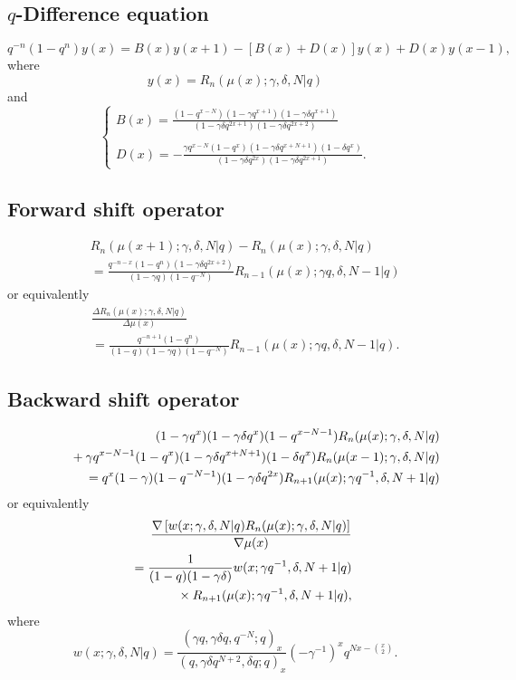 \documentclass[envcountchap,graybox]{svmono}
\newcommand{\mathindent}{\hspace{7.5mm}}
\begin{document}
\subsection*{$q$-Difference equation}
\begin{equation}
\label{dvDualqHahn}
q^{-n}(1-q^n)y(x)=B(x)y(x+1)-\left[B(x)+D(x)\right]y(x)
+D(x)y(x-1),
\end{equation}
where
$$y(x)=R_n(\mu(x);\gamma,\delta,N|q)$$
and
$$\left\{\begin{array}{l}\displaystyle B(x)=\frac{(1-q^{x-N})(1-\gamma q^{x+1})(1-\gamma\delta q^{x+1})}
{(1-\gamma\delta q^{2x+1})(1-\gamma\delta q^{2x+2})}\\
\\
\displaystyle D(x)=-\frac{\gamma q^{x-N}(1-q^x)(1-\gamma\delta q^{x+N+1})(1-\delta q^x)}
{(1-\gamma\delta q^{2x})(1-\gamma\delta q^{2x+1})}.\end{array}\right.$$

\subsection*{Forward shift operator}
\begin{eqnarray}
\label{shift1DualqHahnI}
& &R_n(\mu(x+1);\gamma,\delta,N|q)-R_n(\mu(x);\gamma,\delta,N|q)\nonumber\\
& &{}=\frac{q^{-n-x}(1-q^n)(1-\gamma\delta q^{2x+2})}{(1-\gamma q)(1-q^{-N})}
R_{n-1}(\mu(x);\gamma q,\delta,N-1|q)
\end{eqnarray}
or equivalently
\begin{eqnarray}
\label{shift1DualqHahnII}
& &\frac{\Delta R_n(\mu(x);\gamma,\delta,N|q)}{\Delta\mu(x)}\nonumber\\
& &{}=\frac{q^{-n+1}(1-q^n)}{(1-q)(1-\gamma q)(1-q^{-N})}R_{n-1}(\mu(x);\gamma q,\delta,N-1|q).
\end{eqnarray}

\subsection*{Backward shift operator}
\begin{eqnarray}
\label{shift2DualqHahnI}
& &(1-\gamma q^x)(1-\gamma\delta q^x)(1-q^{x-N-1})R_n(\mu(x);\gamma,\delta,N|q)\nonumber\\
& &{}\mathindent{}+\gamma q^{x-N-1}(1-q^x)(1-\gamma\delta q^{x+N+1})(1-\delta q^x)R_n(\mu(x-1);\gamma,\delta,N|q)\nonumber\\
& &{}=q^x(1-\gamma)(1-q^{-N-1})(1-\gamma\delta q^{2x})R_{n+1}(\mu(x);\gamma q^{-1},\delta,N+1|q)
\end{eqnarray}
or equivalently
\begin{eqnarray}
\label{shift2DualqHahnII}
& &\frac{\nabla\left[w(x;\gamma,\delta,N|q)R_n(\mu(x);\gamma,\delta,N|q)\right]}{\nabla\mu(x)}\nonumber\\
& &{}=\frac{1}{(1-q)(1-\gamma\delta)}w(x;\gamma q^{-1},\delta,N+1|q)\nonumber\\
& &{}\mathindent{}\times R_{n+1}(\mu(x);\gamma q^{-1},\delta,N+1|q),
\end{eqnarray}
where
$$w(x;\gamma,\delta,N|q)=\frac{(\gamma q,\gamma\delta q,q^{-N};q)_x}
{(q,\gamma\delta q^{N+2},\delta q;q)_x}(-\gamma^{-1})^x q^{Nx-\binom{x}{2}}.$$
\end{document}
